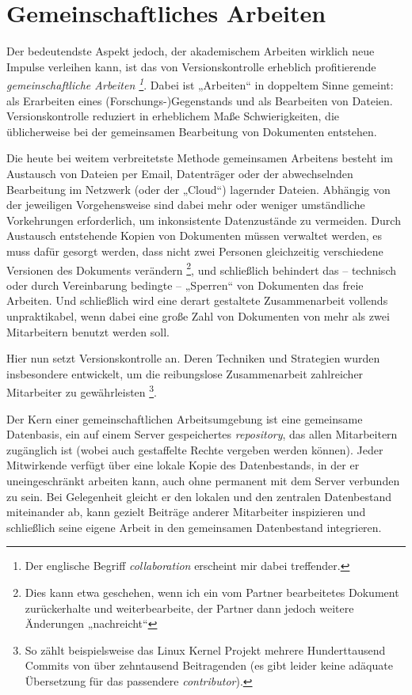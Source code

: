 \documentclass[DIV=12]{scrreprt}
\begin{document}
\section{Gemeinschaftliches Arbeiten}
\label{sec:pt_collaborative-editing}

Der bedeutendste Aspekt jedoch, der akademischem Arbeiten wirklich neue Impulse verleihen kann, ist das von Versionskontrolle erheblich profitierende \emph{gemeinschaftliche Arbeiten%
\footnote{Der englische Begriff \emph{collaboration} erscheint mir dabei treffender.}}.
Dabei ist „Arbeiten“ in doppeltem Sinne gemeint: als Erarbeiten eines (Forschungs-)Gegenstands und als Bearbeiten von Dateien.
Versionskontrolle reduziert in erheblichem Maße Schwierigkeiten, die üblicherweise bei der gemeinsamen Bearbeitung von Dokumenten entstehen.

Die heute bei weitem verbreitetste Methode gemeinsamen Arbeitens besteht im Austausch von Dateien per Email, Datenträger oder der abwechselnden Bearbeitung im Netzwerk (oder der „Cloud“) lagernder Dateien.
Abhängig von der jeweiligen Vorgehensweise sind dabei mehr oder weniger umständliche Vorkehrungen erforderlich, um inkonsistente Datenzustände zu vermeiden.
Durch Austausch entstehende Kopien von Dokumenten müssen verwaltet werden, es muss dafür gesorgt werden, dass nicht zwei Personen gleichzeitig verschiedene Versionen des Dokuments verändern%
\footnote{Dies kann etwa geschehen, wenn ich ein vom Partner bearbeitetes Dokument zurückerhalte und weiterbearbeite, der Partner dann jedoch weitere Änderungen „nachreicht“},
und schließlich behindert das -- technisch oder durch Vereinbarung bedingte -- „Sperren“ von Dokumenten das freie Arbeiten.
Und schließlich wird eine derart gestaltete Zusammenarbeit vollends unpraktikabel, wenn dabei eine große Zahl von Dokumenten von mehr als zwei Mitarbeitern benutzt werden soll.

Hier nun setzt Versionskontrolle an.
Deren Techniken und Strategien wurden insbesondere entwickelt, um die reibungslose Zusammenarbeit zahlreicher Mitarbeiter zu gewährleisten%
\footnote{So zählt beispielsweise das Linux Kernel Projekt mehrere Hunderttausend Commits von über zehntausend Beitragenden (es gibt leider keine adäquate Übersetzung für das passendere \emph{contributor}).}.

Der Kern einer gemeinschaftlichen Arbeitsumgebung ist eine gemeinsame Datenbasis, ein auf einem Server gespeichertes \emph{repository}, das allen Mitarbeitern zugänglich ist (wobei auch gestaffelte Rechte vergeben werden können).
Jeder Mitwirkende verfügt über eine lokale Kopie des Datenbestands, in der er uneingeschränkt arbeiten kann, auch ohne permanent mit dem Server verbunden zu sein.
Bei Gelegenheit gleicht er den lokalen und den zentralen Datenbestand miteinander ab, kann gezielt Beiträge anderer Mitarbeiter inspizieren und schließlich seine eigene Arbeit in den gemeinsamen Datenbestand integrieren.
\end{document}
